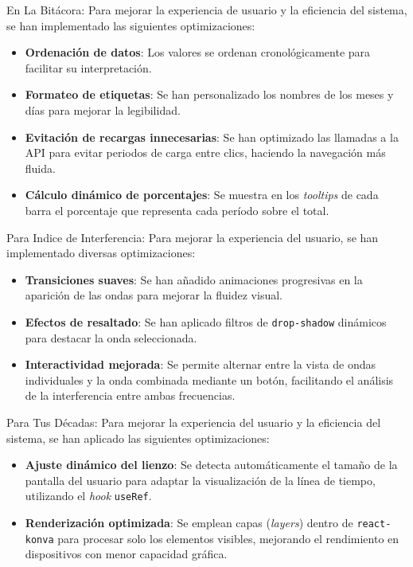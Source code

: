 En La Bitácora:
Para mejorar la experiencia de usuario y la eficiencia del sistema, se han implementado las siguientes optimizaciones:
\begin{itemize}
    \item \textbf{Ordenación de datos}: Los valores se ordenan cronológicamente para facilitar su interpretación.
    \item \textbf{Formateo de etiquetas}: Se han personalizado los nombres de los meses y días para mejorar la legibilidad.
    \item \textbf{Evitación de recargas innecesarias}: Se han optimizado las llamadas a la API para evitar periodos de carga entre clics, haciendo la navegación más fluida.
    \item \textbf{Cálculo dinámico de porcentajes}: Se muestra en los \textit{tooltips} de cada barra el porcentaje que representa cada período sobre el total.
\end{itemize}

Para Indice de Interferencia:
Para mejorar la experiencia del usuario, se han implementado diversas optimizaciones:
\begin{itemize}
    \item \textbf{Transiciones suaves}: Se han añadido animaciones progresivas en la aparición de las ondas para mejorar la fluidez visual.
    \item \textbf{Efectos de resaltado}: Se han aplicado filtros de \texttt{drop-shadow} dinámicos para destacar la onda seleccionada.
    \item \textbf{Interactividad mejorada}: Se permite alternar entre la vista de ondas individuales y la onda combinada mediante un botón, facilitando el análisis de la interferencia entre ambas frecuencias.
\end{itemize}

Para Tus Décadas:
Para mejorar la experiencia del usuario y la eficiencia del sistema, se han aplicado las siguientes optimizaciones:
\begin{itemize}
    \item \textbf{Ajuste dinámico del lienzo}: Se detecta automáticamente el tamaño de la pantalla del usuario para adaptar la visualización de la línea de tiempo, utilizando el \textit{hook} \texttt{useRef}.
    \item \textbf{Renderización optimizada}: Se emplean capas (\textit{layers}) dentro de \texttt{react-konva} para procesar solo los elementos visibles, mejorando el rendimiento en dispositivos con menor capacidad gráfica.
\end{itemize}


